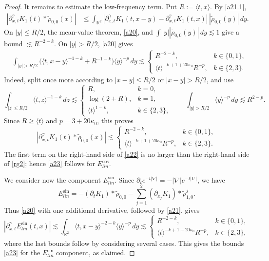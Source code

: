 \documentclass[reqno,11pt]{amsart}
\numberwithin{equation}{section}
\begin{document}
\begin{proof}
		It remains to estimate the low-frequency term. Put
		$R:=\langle t,x\rangle$. By \eqref{a21.1},
		\begin{align*}
			|\partial_{x,t}^{\gamma}K_1(t)*\tilde\rho_{0,0}(x)|&\le\int_{\mathbb{R}^2}
			|\partial_{x,t}^{\gamma}K_1(t,x-y)-\partial_{x,t}^{\gamma}K_1(t,x)|\,|\tilde\rho_{0,0}(y)|\,dy.
		\end{align*}
		On $|y|\leq R/2$, the mean-value theorem, \eqref{a20}, and
		$\int |y||\tilde\rho_{0,0}(y)|\,dy\lesssim1$ give a bound
		$\lesssim R^{-2-k}$. On $|y|>R/2$, \eqref{a20} gives
		\begin{align*}
			&\int_{|y|>R/2}
			\bigl(\langle t,x-y\rangle^{-1-k}+R^{-1-k}\bigr)
			\langle y\rangle^{-p}\,dy\lesssim
			\begin{cases}
				R^{-2-k},&k\in\{0,1\},\\
				\langle t\rangle^{-k+1+20\kappa_0}R^{-p},&k\in\{2,3\}.
			\end{cases}
		\end{align*}
		Indeed, split once more according to $|x-y|\leq R/2$ or $|x-y|>R/2$, and use
		\[
		\int_{|z|\leq R/2}\langle t,z\rangle^{-1-k}\,dz
		\lesssim
		\begin{cases}
			R,&k=0,\\
			\log(2+R),&k=1,\\
			\langle t\rangle^{1-k},&k\in\{2,3\},
		\end{cases}
		\qquad
		\int_{|y|>R/2}\langle y\rangle^{-p}\,dy\lesssim R^{2-p}.
		\]
		Since $R\geq\langle t\rangle$ and $p=3+20\kappa_0$, this proves
		\begin{equation}\label{rg2}
			|\partial_{x,t}^{\gamma}K_1(t)*\tilde\rho_{0,0}(x)|\lesssim
			\begin{cases}
				R^{-2-k},&k\in\{0,1\},\\
				\langle t\rangle^{-k+1+20\kappa_0}R^{-p},&k\in\{2,3\}.
			\end{cases}
		\end{equation}
		The first term on the right-hand side of \eqref{a22} is no larger
		than the right-hand side of \eqref{rg2}; hence \eqref{a23} follows
		for $E_{{lin}}^{\cos}$.
		
		We consider now the component $E^{\sin}_{{lin}}$. Since
		$\partial_te^{-t|\nabla|}=-|\nabla|e^{-t|\nabla|}$, we have
		\begin{equation*}
		E_{{lin}}^{\sin}=-(\partial_tK_1)*\tilde\rho_{0,0}-\sum_{j=1}^{2}(\partial_{x_j}K_1)*\tilde\rho_{1,0}^j.
		\end{equation*}
		Thus \eqref{a20} with one additional derivative, followed by
		\eqref{a21}, gives
		\[
		|\partial_{x,t}^{\gamma}E_{lin}^{\sin}(t,x)|
		\lesssim
		\int_{\mathbb R^2}\langle t,x-y\rangle^{-2-k}
		\langle y\rangle^{-p}\,dy\lesssim
		\begin{cases}
			R^{-2-k},&k\in\{0,1\},\\
			\langle t\rangle^{-k+1+20\kappa_0}R^{-p},&k\in\{2,3\},
		\end{cases}
		\]
	        where the last bounds follow by considering several cases. This gives the bounds \eqref{a23} for the $E_{lin}^{\sin}$ component, as claimed.	
		\end{proof}	
	
\end{document}
